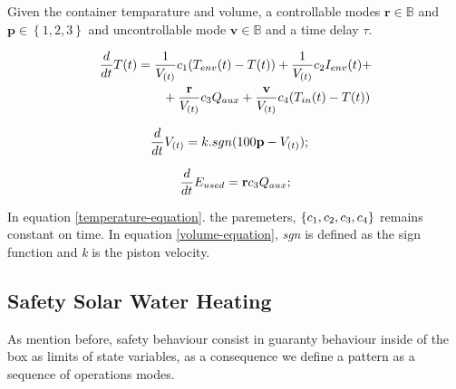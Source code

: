 \documentclass[conference]{IEEEtran}
\begin{document}
Given the container temparature and volume, a controllable modes $\textbf{r}  \in \mathbb{B}$
and $\textbf{p} \in \left\lbrace1,2,3\right\rbrace $ and uncontrollable mode
$\textbf{v}  \in \mathbb{B} $ and a time delay $\tau$.


\begin{align}
    \frac{d}{dt}\tcont &=   \frac{1}{\vcont}  \constone(\tenv-\tcont)+ \frac{1}{\vcont} \consttwo\irradiance+ \notag\\  
    &\qquad + \frac{ \textbf{r} }{\vcont} \constthree \auxheat +  \frac{ \textbf{v} }{\vcont} \constfour(\tin-\tcont)        
\label{temperature-equation}
\end{align}

\begin{equation}
\frac{d}{dt}\vcont = k .sgn(100 \textbf{p}  - \vcont); \quad
\label{volume-equation}
\end{equation}

\begin{equation} 
\frac{d}{dt}E_{used} =  \textbf{r}  \constthree \auxheat ;
\label{Energy-equation}
\end{equation}

In equation \ref{temperature-equation}. the paremeters,  $\left\lbrace 
c_1, c_{2}, c_{3}, c_{4} \right\rbrace $ 
remains constant on time. In equation \ref{volume-equation}, 
\emph{sgn} is defined as the sign function and \emph{k} is the piston velocity.





\subsection{Safety Solar Water Heating}\label{AA}

As mention before, safety behaviour consist in guaranty behaviour
inside of the box as limits of state variables, as a consequence
we define a pattern as a sequence of operations modes.
\end{document}
